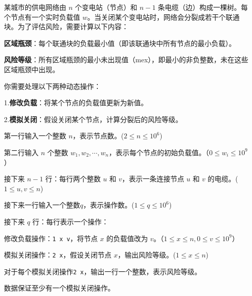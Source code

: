 
某城市的供电网络由 $n$ 个变电站（节点）和 $n-1$ 条电缆（边）构成一棵树。每个节点有一个实时负载值 $w$。当关闭某个变电站时，网络会分裂成若干个联通块。为了评估风险，需要计算以下内容：

\textbf{区域瓶颈}：每个联通块的负载最小值（即该联通块中所有节点的最小负载）。

\textbf{风险等级}：所有区域瓶颈的最小未出现值（mex），即最小的非负整数，未在这些区域瓶颈中出现。

你需要处理以下两种动态操作：

1.\textbf{修改负载}：将某个节点的负载值更新为新值。

2.\textbf{模拟关闭}：假设关闭某个节点，计算分裂后的风险等级。


第一行输入一个整数 $n$，表示节点数。($2 \leqslant n \leqslant 10^6$)

第二行输入 $n$ 个整数 $w_1,w_2, \cdots , w_n$，表示每个节点的初始负载值。（$0\leqslant w_i\leqslant 10^9$）

接下来 $n-1$ 行：每行两个整数 $u$ 和 $v$，表示一条连接节点 $u$ 和 $v$ 的电缆。($1\leqslant u,v \leqslant n$)

接下来一行输入一个整数$q$，表示操作数。($1 \leqslant q \leqslant 10^6$)

接下来 $q$ 行：每行表示一个操作：

修改负载操作：\verb|1 x v|，将节点 $x$ 的负载值改为 $v$。（$1\leqslant x \leqslant n,0\leqslant v \leqslant 10^9$）

模拟关闭操作：\verb|2 x|，假设关闭节点 $x$，输出风险等级。($1\leqslant x \leqslant n$)


对于每个模拟关闭操作\verb|2 x|，输出一行一个整数，表示风险等级。

数据保证至少有一个模拟关闭操作。

